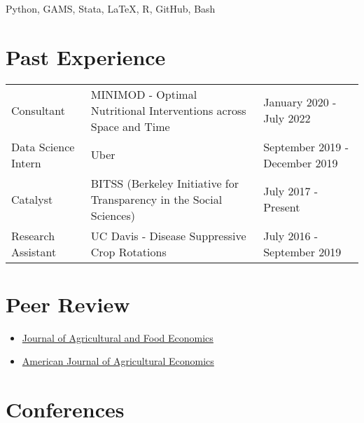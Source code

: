 \documentclass[
  11pt]{article}
\providecommand{\tightlist}{%
  \setlength{\itemsep}{0pt}\setlength{\parskip}{0pt}}
\def\toprule{}
\def\bottomrule{}
\begin{document}
Python, GAMS, Stata, LaTeX, R, GitHub, Bash

\hypertarget{past-experience}{%
\section{Past Experience}\label{past-experience}}

\begin{longtable}[]{@{}
  >{\raggedright\arraybackslash}p{}
  >{\raggedright\arraybackslash}p{}
  >{\raggedright\arraybackslash}p{}@{}}
\toprule
\endhead
Consultant & MINIMOD - Optimal Nutritional Interventions across Space
and Time & January 2020 - July 2022 \\
Data Science Intern & Uber & September 2019 - December 2019 \\
Catalyst & BITSS (Berkeley Initiative for Transparency in the Social
Sciences) & July 2017 - Present \\
Research Assistant & UC Davis - Disease Suppressive Crop Rotations &
July 2016 - September 2019 \\
\bottomrule
\end{longtable}

\hypertarget{peer-review}{%
\section{Peer Review}\label{peer-review}}

\begin{itemize}
\tightlist
\item
  \href{https://agrifoodecon.springeropen.com/}{Journal of Agricultural
  and Food Economics}
\item
  \href{https://onlinelibrary.wiley.com/journal/14678276}{American
  Journal of Agricultural Economics}
\end{itemize}

\hypertarget{conferences}{%
\section{Conferences}\label{conferences}}
\end{document}
